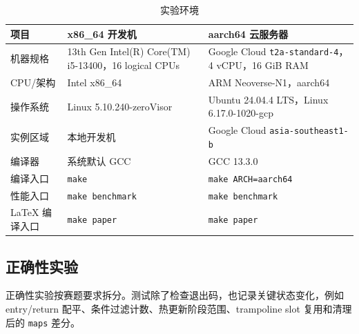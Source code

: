 \documentclass[UTF8,a4paper,11pt,fontset=fandol]{ctexart}
\newcommand{\code}[1]{\texttt{#1}}
\begin{document}
\begin{table}[H]
\centering
\caption{实验环境}
\label{tab:env}
\begin{tabularx}{\textwidth}{P{3.2cm}Y Y}
\toprule
\textbf{项目} & \textbf{x86\_64 开发机} & \textbf{aarch64 云服务器}\\
\midrule
机器规格 & 13th Gen Intel(R) Core(TM) i5-13400，16 logical CPUs & Google Cloud \code{t2a-standard-4}，4 vCPU，16 GiB RAM\\
CPU/架构 & Intel x86\_64 & ARM Neoverse-N1，aarch64\\
操作系统 & Linux 5.10.240-zeroVisor & Ubuntu 24.04.4 LTS，Linux 6.17.0-1020-gcp\\
实例区域 & 本地开发机 & Google Cloud \code{asia-southeast1-b}\\
编译器 & 系统默认 GCC & GCC 13.3.0\\
编译入口 & \code{make} & \code{make ARCH=aarch64}\\
性能入口 & \code{make benchmark} & \code{make benchmark}\\
LaTeX 编译入口 & \code{make paper} & \code{make paper}\\
\bottomrule
\end{tabularx}
\end{table}

\subsection{正确性实验}

正确性实验按赛题要求拆分。测试除了检查退出码，也记录关键状态变化，例如 entry/return 配平、条件过滤计数、热更新阶段范围、trampoline slot 复用和清理后的 \code{maps} 差分。
\end{document}
